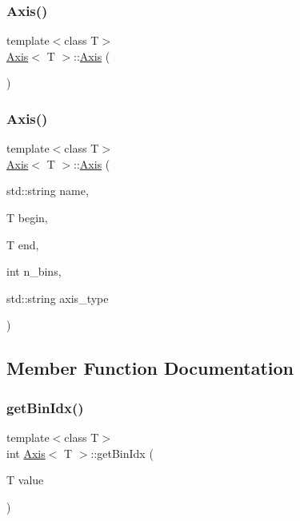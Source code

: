 \subsubsection{\texorpdfstring{Axis()}{Axis()}\hspace{0.1cm}{\footnotesize\ttfamily [1/2]}}
{\footnotesize\ttfamily template$<$class T$>$ \\
\hyperlink{class_axis}{Axis}$<$ T $>$\+::\hyperlink{class_axis}{Axis} (\begin{DoxyParamCaption}{ }\end{DoxyParamCaption})\hspace{0.3cm}{\ttfamily [default]}}

\mbox{\label{class_axis_a2c03face6176cce979d869a0dc615a5c}} 
\subsubsection{\texorpdfstring{Axis()}{Axis()}\hspace{0.1cm}{\footnotesize\ttfamily [2/2]}}
{\footnotesize\ttfamily template$<$class T$>$ \\
\hyperlink{class_axis}{Axis}$<$ T $>$\+::\hyperlink{class_axis}{Axis} (\begin{DoxyParamCaption}\item[{std\+::string}]{name,  }\item[{T}]{begin,  }\item[{T}]{end,  }\item[{int}]{n\+\_\+bins,  }\item[{std\+::string}]{axis\+\_\+type }\end{DoxyParamCaption})\hspace{0.3cm}{\ttfamily [inline]}}



\subsection{Member Function Documentation}
\mbox{\label{class_axis_ac19c94d0b42cbe7129d0218bcc6156a0}} 
\subsubsection{\texorpdfstring{get\+Bin\+Idx()}{getBinIdx()}}
{\footnotesize\ttfamily template$<$class T$>$ \\
int \hyperlink{class_axis}{Axis}$<$ T $>$\+::get\+Bin\+Idx (\begin{DoxyParamCaption}\item[{T}]{value }\end{DoxyParamCaption})\hspace{0.3cm}{\ttfamily [inline]}}

